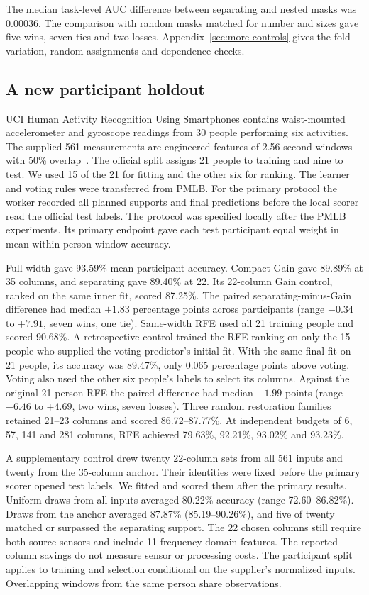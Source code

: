 The median task-level AUC difference between separating and nested masks was 0.00036. The comparison with random masks matched for number and sizes gave five wins, seven ties and two losses. Appendix~\ref{sec:more-controls} gives the fold variation, random assignments and dependence checks.

\subsection{A new participant holdout}
UCI Human Activity Recognition Using Smartphones contains waist-mounted accelerometer and gyroscope readings from 30 people performing six activities. The supplied 561 measurements are engineered features of 2.56-second windows with 50\% overlap~\cite{hardata}. The official split assigns 21 people to training and nine to test. We used 15 of the 21 for fitting and the other six for ranking. The learner and voting rules were transferred from PMLB. For the primary protocol the worker recorded all planned supports and final predictions before the local scorer read the official test labels. The protocol was specified locally after the PMLB experiments. Its primary endpoint gave each test participant equal weight in mean within-person window accuracy.

Full width gave 93.59\% mean participant accuracy. Compact Gain gave 89.89\% at 35 columns, and separating gave 89.40\% at 22. Its 22-column Gain control, ranked on the same inner fit, scored 87.25\%. The paired separating-minus-Gain difference had median $+1.83$ percentage points across participants (range $-0.34$ to $+7.91$, seven wins, one tie). Same-width RFE used all 21 training people and scored 90.68\%. A retrospective control trained the RFE ranking on only the 15 people who supplied the voting predictor's initial fit. With the same final fit on 21 people, its accuracy was 89.47\%, only 0.065 percentage points above voting. Voting also used the other six people's labels to select its columns. Against the original 21-person RFE the paired difference had median $-1.99$ points (range $-6.46$ to $+4.69$, two wins, seven losses). Three random restoration families retained 21--23 columns and scored 86.72--87.77\%. At independent budgets of 6, 57, 141 and 281 columns, RFE achieved 79.63\%, 92.21\%, 93.02\% and 93.23\%.

A supplementary control drew twenty 22-column sets from all 561 inputs and twenty from the 35-column anchor. Their identities were fixed before the primary scorer opened test labels. We fitted and scored them after the primary results. Uniform draws from all inputs averaged 80.22\% accuracy (range 72.60--86.82\%). Draws from the anchor averaged 87.87\% (85.19--90.26\%), and five of twenty matched or surpassed the separating support. The 22 chosen columns still require both source sensors and include 11 frequency-domain features. The reported column savings do not measure sensor or processing costs. The participant split applies to training and selection conditional on the supplier's normalized inputs. Overlapping windows from the same person share observations.

